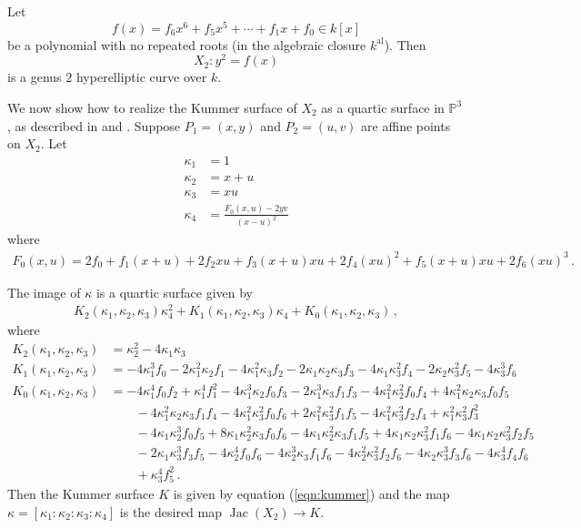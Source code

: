\documentclass[reqno, 12pt]{amsart}
\theoremstyle{definition}
\renewcommand{\P}{\mathbb P}
\newcommand{\kal}{k^{\mathrm{al}}}
\DeclareMathOperator{\Jac}{Jac}
\begin{document}
Let
$$
f(x) = f_6 x^6 + f_5 x^5 + \cdots + f_1 x + f_0 \in k[x]
$$
be a polynomial with no repeated roots (in the algebraic closure $\kal$). Then
$$
X_2: y^2 = f(x)
$$
is a genus $2$ hyperelliptic curve over $k$.

We now show how to realize the Kummer surface of $X_2$ as a quartic surface in $\P^3$, as described in \cite{Mueller} and \cite{CasselsFlynn}. Suppose $P_1 = (x,y)$ and $P_2 = (u,v)$ are affine points on $X_2$. Let
\begin{align*}
\kappa_1 &= 1\\
\kappa_2 &= x+u\\
\kappa_3 &= xu\\
\kappa_4 &= \frac{F_0(x,u) - 2yv}{(x-u)^2}
\end{align*}
where
\begin{align*}
F_0(x,u) = 2 f_0 + f_1(x+u) + 2 f_2 xu + f_3(x+u)xu + 2 f_4(xu)^2 + f_5(x+u)xu + 2 f_6 (xu)^3 \, .
\end{align*}

The image of $\kappa$ is a quartic surface given by
\begin{align} \label{eqn:kummer}
K_2(\kappa_1, \kappa_2, \kappa_3) \kappa_4^2 + K_1(\kappa_1, \kappa_2, \kappa_3) \kappa_4 + K_0(\kappa_1, \kappa_2, \kappa_3) \, ,
\end{align}
where
\begin{align*}
K_2(\kappa_1, \kappa_2, \kappa_3) &= \kappa_2^2 - 4 \kappa_1 \kappa_3\\
K_1(\kappa_1, \kappa_2, \kappa_3) &= -4 \kappa_1^3 f_0 - 2 \kappa_1^2 \kappa_2 f_1 - 4 \kappa_1^2 \kappa_3 f_2 - 2 \kappa_1 \kappa_2 \kappa_3  f_3 - 4 \kappa_1 \kappa_3^2 f_4 -2 \kappa_2 \kappa_3^2 f_5 - 4 \kappa_3^3 f_6\\
K_0(\kappa_1, \kappa_2, \kappa_3) &=
-4 \kappa_1^4 f_0 f_2 + \kappa_1^4 f_1^2 - 4 \kappa_1^3 \kappa_2 f_0 f_3 - 2 \kappa_1^3 \kappa_3 f_1 f_3 - 4 \kappa_1^2 \kappa_2^2 f_0 f_4 + 4 \kappa_1^2 \kappa_2 \kappa_3 f_0 f_5\\
	&\qquad - 4 \kappa_1^2 \kappa_2 \kappa_3 f_1 f_4 - 4 \kappa_1^2 \kappa_3^2 f_0 f_6 + 2 \kappa_1^2 \kappa_3^2 f_1 f_5 -4 \kappa_1^2 \kappa_3^2 f_2 f_4 +   \kappa_1^2 \kappa_3^2 f_3^2\\
	&\qquad - 4 \kappa_1 \kappa_2^3 f_0 f_5 + 8 \kappa_1 \kappa_2^2 \kappa_3 f_0 f_6 - 4 \kappa_1 \kappa_2^2 \kappa_3 f_1 f_5 + 4 \kappa_1 \kappa_2 \kappa_3^2 f_1 f_6 - 4 \kappa_1 \kappa_2 \kappa_3^2 f_2 f_5\\
	&\qquad - 2  \kappa_1 \kappa_3^3 f_3 f_5 - 4 \kappa_2^4 f_0 f_6 - 4 \kappa_2^3 \kappa_3 f_1 f_6 - 4 \kappa_2^2 \kappa_3^2 f_2  f_6 -4 \kappa_2 \kappa_3^3 f_3 f_6 - 4 \kappa_3^4 f_4 f_6\\
	&\qquad + \kappa_3^4 f_5^2 \, .
\end{align*}
Then the Kummer surface $K$ is given by equation (\ref{eqn:kummer}) and the map $\kappa = [\kappa_1 : \kappa_2 : \kappa_3 : \kappa_4]$ is the desired map $\Jac(X_2) \to K$.
\end{document}
